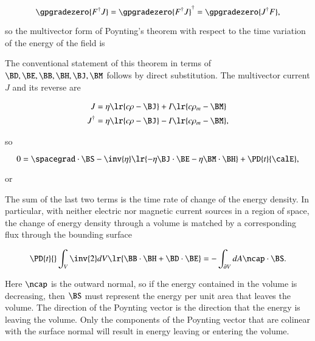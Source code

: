 \begin{equation}\label{eqn:poyntingTheorem:1000}
\gpgradezero{ F^\dagger J }
=
\gpgradezero{ F^\dagger J }^\dagger
=
\gpgradezero{ J^\dagger F },
\end{equation}

so the
multivector form of Poynting's theorem with respect to the time variation of the energy of the field is


The conventional statement of this theorem in terms of \( \BD, \BE, \BB, \BH, \BJ, \BM \) follows by direct substitution.
The multivector current \( J \) and its reverse are

\begin{dmath}\label{eqn:poyntingTheorem:160}
\begin{aligned}
J &= \eta \lr{ c \rho - \BJ } + I \lr{ c \rho_m - \BM } \\
J^\dagger &= \eta \lr{ c \rho - \BJ } - I \lr{ c \rho_m - \BM },
\end{aligned}
\end{dmath}

so

\begin{dmath}\label{eqn:poyntingTheorem:180}
0 =
\spacegrad \cdot \BS
-
\inv{\eta}
\lr{
- \eta \BJ \cdot \BE
- \eta \BM \cdot \BH
}
+ \PD{t}{\calE},
\end{dmath}

or

The sum of the last two terms is the time rate of change of the energy density.
In particular,
with neither electric nor magnetic current sources in a region of space,
the change of energy density through a volume is matched by a corresponding flux through the bounding surface

\begin{dmath}\label{eqn:poyntingTheorem:740}
\PD{t}{} \int_V
\inv{2} dV \lr{
\BB \cdot \BH
+ \BD \cdot \BE
}
=
-\int_{\partial V} dA \ncap \cdot \BS.
\end{dmath}

Here \( \ncap \) is the outward normal, so if the energy contained in the volume is decreasing, then \( \BS \) must represent the energy per unit area that leaves the volume.
The direction of the Poynting vector is the direction that the energy is leaving the volume.
Only the components of the Poynting vector that are colinear with the surface normal will result in energy leaving or entering the volume.

